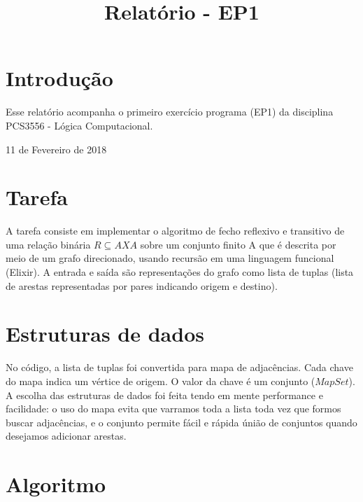 \documentclass[conference]{IEEEtran}
\begin{document}
\title{Relatório - EP1}

\author{
}

\maketitle

\IEEEpeerreviewmaketitle

\section{Introdução}
Esse relatório acompanha o primeiro exercício programa (EP1) da disciplina PCS3556 - Lógica Computacional.

\hfill 11 de Fevereiro de 2018

\section{Tarefa}

A tarefa consiste em implementar o algoritmo de fecho reflexivo e transitivo de uma relação binária $R \subseteq A X A$ sobre um conjunto finito A que é descrita por meio de um grafo direcionado, usando recursão em uma linguagem funcional (Elixir). A entrada e saída são representações do grafo como lista de tuplas (lista de arestas representadas por pares indicando origem e destino).

\section{Estruturas de dados}

No código, a lista de tuplas foi convertida para mapa de adjacências. Cada chave do mapa indica um vértice de origem. O valor da chave é um conjunto ($MapSet$). A escolha das estruturas de dados foi feita tendo em mente performance e facilidade: o uso do mapa evita que varramos toda a lista toda vez que formos buscar adjacências, e o conjunto permite fácil e rápida únião de conjuntos quando desejamos adicionar arestas.

\section{Algoritmo}
\end{document}
